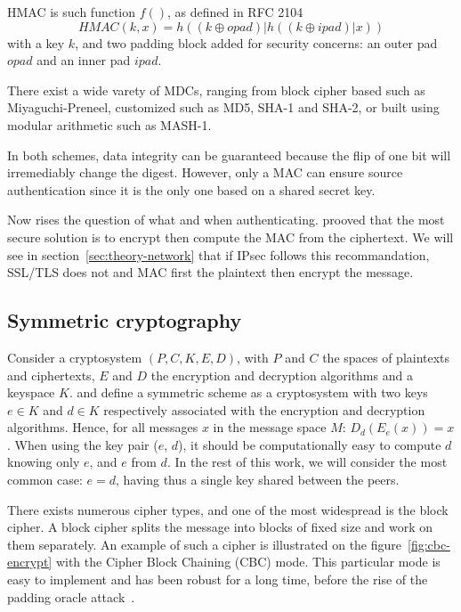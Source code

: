 HMAC is such function $f()$, as defined in RFC 2104~\cite{rfc2104}
\[
	HMAC(k, x) = h((k\oplus opad)|h((k\oplus ipad)|x))
\]
with a key $k$, and two padding block added for security concerns: an outer pad $opad$ and an inner pad $ipad$.

\noindent There exist a wide varety of MDCs, ranging from block cipher based such as Miyaguchi-Preneel, customized such as MD5, SHA-1 and SHA-2, or built using modular arithmetic such as MASH-1.

In both schemes, data integrity can be guaranteed because the flip of one bit will irremediably change the digest.
However, only a MAC can ensure source authentication since it is the only one based on a shared secret key.

Now rises the question of what and when authenticating.
\citet{Bellare2000} prooved that the most secure solution is to encrypt then compute the MAC from the ciphertext.
We will see in section~\ref{sec:theory-network} that if IPsec follows this recommandation, SSL/TLS does not and MAC first the plaintext then encrypt the message.











\subsection{Symmetric cryptography}\label{sec:symmetric}
Consider a cryptosystem $(P,C,K,E,D)$, with $P$ and $C$ the spaces of plaintexts and ciphertexts, $E$ and $D$ the encryption and decryption algorithms and a keyspace $K$.
\citet{Menezes1996} and \citet{infof405} define a symmetric scheme as a cryptosystem with two keys $e \in K$ and $d \in K$ respectively associated with the encryption and decryption algorithms.
Hence, for all messages $x$ in the message space $M$: $D_d(E_e(x)) = x$.
When using the key pair ($e$, $d$), it should be computationally easy to compute $d$ knowing only $e$, and $e$ from $d$.
In the rest of this work, we will consider the most common case: $e = d$, having thus a single key shared between the peers.

There exists numerous cipher types, and one of the most widespread is the block cipher.
A block cipher splits the message into blocks of fixed size and work on them separately.
An example of such a cipher is illustrated on the figure~\ref{fig:cbc-encrypt} with the Cipher Block Chaining (CBC) mode.
This particular mode is easy to implement and has been robust for a long time, before the rise of the padding oracle attack~\cite{vaudenay2002}.

